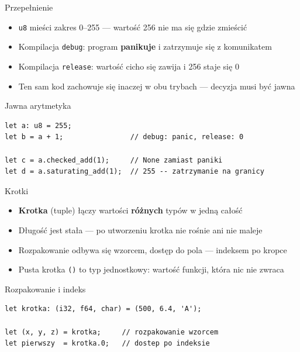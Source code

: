 \begin{frame}[fragile]{Przepełnienie}
  \begin{itemize}
    \item \texttt{u8} mieści zakres 0--255 --- wartość 256 nie ma się gdzie zmieścić
    \item Kompilacja \texttt{debug}: program \textbf{panikuje} i zatrzymuje się z komunikatem
    \item Kompilacja \texttt{release}: wartość cicho się zawija i 256 staje się 0
    \item Ten sam kod zachowuje się inaczej w obu trybach --- decyzja musi być jawna
  \end{itemize}
  \begin{alertblock}{Jawna arytmetyka}
\begin{lstlisting}
let a: u8 = 255;
let b = a + 1;                // debug: panic, release: 0

let c = a.checked_add(1);     // None zamiast paniki
let d = a.saturating_add(1);  // 255 -- zatrzymanie na granicy
\end{lstlisting}
  \end{alertblock}
\end{frame}

\begin{frame}[fragile]{Krotki}
  \begin{itemize}
    \item \textbf{Krotka} (tuple) łączy wartości \textbf{różnych} typów w jedną całość
    \item Długość jest stała --- po utworzeniu krotka nie rośnie ani nie maleje
    \item Rozpakowanie odbywa się wzorcem, dostęp do pola --- indeksem po kropce
    \item Pusta krotka \texttt{()} to typ jednostkowy: wartość funkcji, która nic nie zwraca
  \end{itemize}
  \begin{block}{Rozpakowanie i indeks}
\begin{lstlisting}
let krotka: (i32, f64, char) = (500, 6.4, 'A');

let (x, y, z) = krotka;     // rozpakowanie wzorcem
let pierwszy  = krotka.0;   // dostep po indeksie
\end{lstlisting}
  \end{block}
\end{frame}

